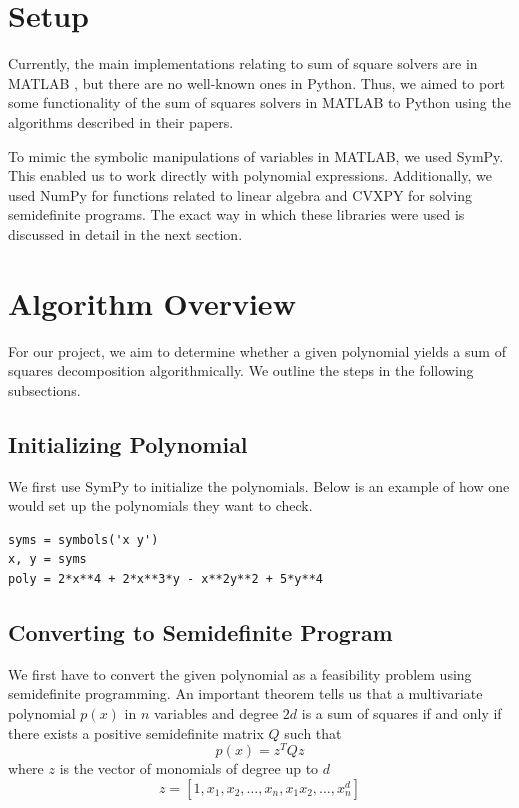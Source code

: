 \documentclass{article}
\begin{document}
\section{Setup}

Currently, the main implementations relating to sum of square solvers are in MATLAB \cite{sostools}, but there are no well-known ones in Python. Thus, we aimed to port some functionality of the sum of squares solvers in MATLAB to Python using the algorithms described in their papers.

To mimic the symbolic manipulations of variables in MATLAB, we used SymPy. This enabled us to work directly with polynomial expressions. Additionally, we used NumPy for functions related to linear algebra and CVXPY for solving semidefinite programs. The exact way in which these libraries were used is discussed in detail in the next section.

\section{Algorithm Overview}

For our project, we aim to determine whether a given polynomial yields a sum of
squares decomposition algorithmically. We outline the steps in the following subsections.

\subsection{Initializing Polynomial}

We first use SymPy to initialize the polynomials. Below is an example of how one would set up the polynomials they want to check.

\begin{verbatim}
syms = symbols('x y')
x, y = syms
poly = 2*x**4 + 2*x**3*y - x**2y**2 + 5*y**4
\end{verbatim}

\subsection{Converting to Semidefinite Program}
We first have to convert the given polynomial as a feasibility problem using
semidefinite programming. An important theorem tells us that a multivariate polynomial $p(x)$ in $n$
variables and degree $2d$ is a sum of squares if and only if there exists a
positive semidefinite matrix $Q$ such that $$p(x) = z^T Q z$$ where $z$ is the
vector of monomials of degree up to $d$ \cite{sos_convex}$$z = [1,x_1,x_2,\ldots,x_n, x_1x_2,
\ldots, x_n^d]$$ 
\end{document}
